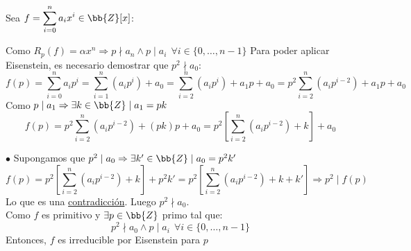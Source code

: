 \documentclass[12pt]{article}
\newcounter{ejercicio}[section] %
\newcounter{ejercicio}
\begin{document}
\begin{ejercicio}[3.5 puntos]
\begin{enumerate}
                \noindent
                Sea $f = \displaystyle\sum_{i=0}^n a_i x^i \in \bb{Z}[x]$:

                \noindent
                Como $R_p(f) = \alpha x^n \Rightarrow p \nmid a_n \land p \mid a_i~~\forall i \in \{0, \ldots, n-1\}$\newline
                Para poder aplicar Eisenstein, es necesario demostrar que $p^2 \nmid a_0$:\\

                \noindent
                $$f(p) = \displaystyle \sum_{i=0}^n a_i p^i = \sum_{i=1}^n (a_i p^i) + a_0 = \sum_{i=2}^n (a_i p^i) + a_1 p + a_0 = p^2 \sum_{i=2}^n (a_i p^{i-2}) + a_1 p + a_0$$
                Como $p\mid a_1\Rightarrow \exists k \in \bb{Z} \mid a_1 = pk$
                $$f(p) = p^2 \displaystyle\sum_{i=2}^n (a_i p^{i-2}) + (pk)p+a_0 = p^2 \left[\sum_{i=2}^n (a_i p^{i-2}) + k \right] + a_0$$

                \noindent
                $\bullet$ Supongamos que $p^2 \mid a_0 \Rightarrow \exists k' \in \bb{Z} \mid a_0 = p^2 k'$ 
            $$f(p) = p^2 \left[\sum_{i=2}^n(a_ip^{i-2})+k\right] + p^2 k' = p^2 \left[\sum_{i=2}^n (a_i p^{i-2})+k+k'\right] \Rightarrow p^2 \mid f(p)$$
            Lo que es una \underline{contradicción}. Luego $p^2 \nmid a_0$.\\

            \noindent
            Como $f$ es primitivo y $\exists p \in \bb{Z}$ primo tal que:
            $$p^2 \nmid a_0 \land p \mid a_i~~\forall i \in \{0, \ldots, n-1\}$$
            Entonces, $f$ es irreducible por Eisenstein para $p$
                
        \end{enumerate}
    \end{ejercicio}
\end{document}
